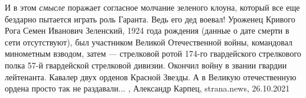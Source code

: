 И в этом \emph{смысле} поражает согласное молчание зеленого клоуна, который все еще
бездарно пытается играть роль Гаранта. Ведь его дед воевал! Уроженец Кривого
Рога Семен Иванович Зеленский, 1924 года рождения (данные о дате смерти в сети
отсутствуют), был участником Великой Отечественной войны, командовал минометным
взводом, затем — стрелковой ротой 174-го гвардейского стрелкового полка 57-й
гвардейской стрелковой дивизии. Окончил войну в звании гвардии лейтенанта.
Кавалер двух орденов Красной Звезды. А в Великую отечественную ордена просто
так не раздавали...
, 
Александр Карпец, strana.news, 26.10.2021
